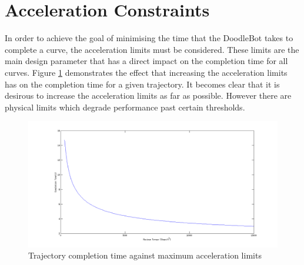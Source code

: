 \section{Acceleration Constraints}
In order to achieve the goal of minimising the time that the DoodleBot takes to complete a curve, the acceleration limits must be considered. These limits are the main design parameter that has a direct impact on the completion time for all curves. Figure \ref{fig:maxAccel} demonstrates the effect that increasing the acceleration limits has on the completion time for a given trajectory. It becomes clear that it is desirous to increase the acceleration limits as far as possible. However there are physical limits which degrade performance past certain thresholds.

\begin{figure}[htbp]  
\includegraphics[width=\textwidth]{figures/performance/maxTorque.png}
\caption[Trajectory completion time against maximum acceleration limits]{Trajectory completion time against maximum acceleration limits
\label{fig:maxAccel}}
\end{figure}  	

